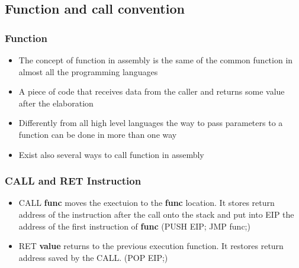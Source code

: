 \documentclass[]{beamer}
\begin{document}
\subsection{Function and call convention}
		\begin{frame}
			\frametitle{Function}
			\begin{itemize}
				\item{The concept of function in assembly is the same of the common function in almost all the programming languages }
				\item{A piece of code that receives data from the caller and returns some value after the elaboration}
				\item{Differently from all high level languages the way to pass parameters to a function can be done in more than one way}
				\item{Exist also several ways to call function in assembly}
			\end{itemize}
		\end{frame}
      \begin{frame}
      \frametitle{CALL and RET Instruction}
        \begin{itemize}
            \item{CALL {\bf func} moves the exectuion to the {\bf func} location. It stores return address of the instruction after the call onto the stack and put into EIP the address of the first instruction of {\bf func}} (PUSH EIP; JMP func;)
            \item{RET {\bf value} returns to the previous execution function. It restores return address saved by the CALL.} (POP EIP;)
        \end{itemize}
     \end{frame}
\end{document}
